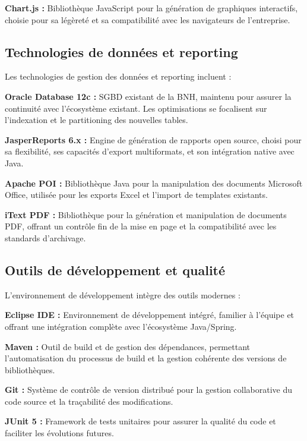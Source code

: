 \textbf{Chart.js :} Bibliothèque JavaScript pour la génération de graphiques interactifs, choisie pour sa légèreté et sa compatibilité avec les navigateurs de l'entreprise.

\subsection{Technologies de données et reporting}

Les technologies de gestion des données et reporting incluent :

\medskip

\textbf{Oracle Database 12c :} SGBD existant de la BNH, maintenu pour assurer la continuité avec l'écosystème existant. Les optimisations se focalisent sur l'indexation et le partitioning des nouvelles tables.

\textbf{JasperReports 6.x :} Engine de génération de rapports open source, choisi pour sa flexibilité, ses capacités d'export multiformats, et son intégration native avec Java.

\textbf{Apache POI :} Bibliothèque Java pour la manipulation des documents Microsoft Office, utilisée pour les exports Excel et l'import de templates existants.

\textbf{iText PDF :} Bibliothèque pour la génération et manipulation de documents PDF, offrant un contrôle fin de la mise en page et la compatibilité avec les standards d'archivage.

\subsection{Outils de développement et qualité}

L'environnement de développement intègre des outils modernes :

\medskip

\textbf{Eclipse IDE :} Environnement de développement intégré, familier à l'équipe et offrant une intégration complète avec l'écosystème Java/Spring.

\textbf{Maven :} Outil de build et de gestion des dépendances, permettant l'automatisation du processus de build et la gestion cohérente des versions de bibliothèques.

\textbf{Git :} Système de contrôle de version distribué pour la gestion collaborative du code source et la traçabilité des modifications.

\textbf{JUnit 5 :} Framework de tests unitaires pour assurer la qualité du code et faciliter les évolutions futures.

